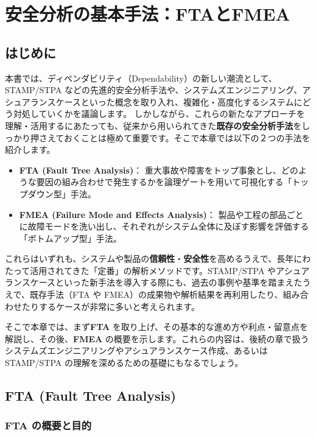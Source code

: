 \chapter{安全分析の基本手法：FTAとFMEA}
\label{chap2}

\section{はじめに}

本書では、ディペンダビリティ（Dependability）の新しい潮流として、STAMP/STPA などの先進的安全分析手法や、システムズエンジニアリング、アシュアランスケースといった概念を取り入れ、複雑化・高度化するシステムにどう対処していくかを議論します。  
しかしながら、これらの新たなアプローチを理解・活用するにあたっても、従来から用いられてきた\textbf{既存の安全分析手法}をしっかり押さえておくことは極めて重要です。そこで本章では以下の２つの手法を紹介します。

\begin{itemize}
 \item \textbf{FTA (Fault Tree Analysis)}：  
   重大事故や障害をトップ事象とし、どのような要因の組み合わせで発生するかを論理ゲートを用いて可視化する「トップダウン型」手法。
 \item \textbf{FMEA (Failure Mode and Effects Analysis)}：  
   製品や工程の部品ごとに故障モードを洗い出し、それぞれがシステム全体に及ぼす影響を評価する「ボトムアップ型」手法。
\end{itemize}

これらはいずれも、システムや製品の\textbf{信頼性}・\textbf{安全性}を高めるうえで、長年にわたって活用されてきた「定番」の解析メソッドです。STAMP/STPA やアシュアランスケースといった新手法を導入する際にも、過去の事例や基準を踏まえたうえで、既存手法（FTA や FMEA）の成果物や解析結果を再利用したり、組み合わせたりするケースが非常に多いと考えられます。

そこで本章では、まず\textbf{FTA} を取り上げ、その基本的な進め方や利点・留意点を解説し、その後、\textbf{FMEA} の概要を示します。これらの内容は、後続の章で扱うシステムズエンジニアリングやアシュアランスケース作成、あるいは STAMP/STPA の理解を深めるための基礎にもなるでしょう。

\section{FTA (Fault Tree Analysis)}
\label{sec:FTA}

\subsection{FTA の概要と目的}

